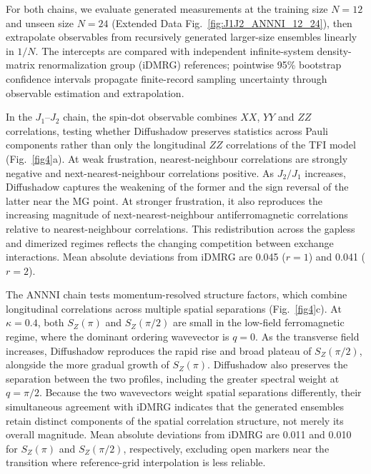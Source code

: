 \documentclass[pdflatex,sn-nature]{sn-jnl}%
\theoremstyle{thmstyleone}%
\theoremstyle{thmstyletwo}%
\theoremstyle{thmstylethree}%
\begin{document}
For both chains, we evaluate generated measurements at the training size $N=12$ and unseen size $N=24$ (Extended Data Fig.~\ref{fig:J1J2_ANNNI_12_24}), then extrapolate observables from recursively generated larger-size ensembles linearly in $1/N$. The intercepts are compared with independent infinite-system density-matrix renormalization group (iDMRG) references; pointwise 95\% bootstrap confidence intervals propagate finite-record sampling uncertainty through observable estimation and extrapolation.

In the $J_1$--$J_2$ chain, the spin-dot observable combines $XX$, $YY$ and $ZZ$ correlations, testing whether Diffushadow preserves statistics across Pauli components rather than only the longitudinal $ZZ$ correlations of the TFI model (Fig.~\ref{fig4}a). At weak frustration, nearest-neighbour correlations are strongly negative and next-nearest-neighbour correlations positive. As $J_2/J_1$ increases, Diffushadow captures the weakening of the former and the sign reversal of the latter near the MG point. At stronger frustration, it also reproduces the increasing magnitude of next-nearest-neighbour antiferromagnetic correlations relative to nearest-neighbour correlations. This redistribution across the gapless and dimerized regimes reflects the changing competition between exchange interactions. Mean absolute deviations from iDMRG are 0.045 ($r=1$) and 0.041 ($r=2$).

The ANNNI chain tests momentum-resolved structure factors, which combine longitudinal correlations across multiple spatial separations (Fig.~\ref{fig4}c). At $\kappa=0.4$, both $S_Z(\pi)$ and $S_Z(\pi/2)$ are small in the low-field ferromagnetic regime, where the dominant ordering wavevector is $q=0$. As the transverse field increases, Diffushadow reproduces the rapid rise and broad plateau of $S_Z(\pi/2)$, alongside the more gradual growth of $S_Z(\pi)$. Diffushadow also preserves the separation between the two profiles, including the greater spectral weight at $q=\pi/2$. Because the two wavevectors weight spatial separations differently, their simultaneous agreement with iDMRG indicates that the generated ensembles retain distinct components of the spatial correlation structure, not merely its overall magnitude. Mean absolute deviations from iDMRG are 0.011 and 0.010 for $S_Z(\pi)$ and $S_Z(\pi/2)$, respectively, excluding open markers near the transition where reference-grid interpolation is less reliable.
\end{document}
